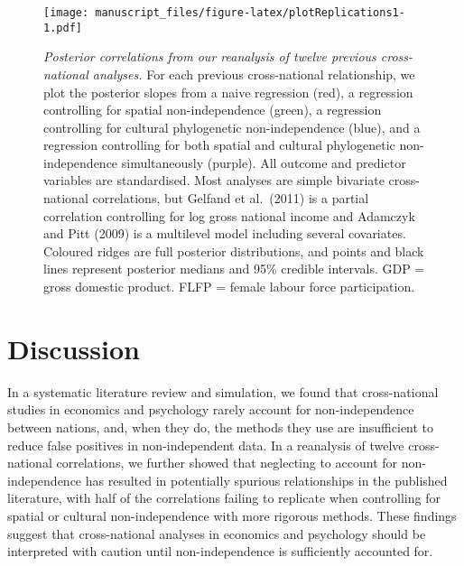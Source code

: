 \documentclass[
  man,floatsintext]{apa6}
\begin{document}
\begin{figure}
\centering
\texttt{[image: manuscript\_files/figure-latex/plotReplications1-1.pdf]}
\caption{\label{fig:plotReplications1}\emph{Posterior correlations from our reanalysis of twelve previous cross-national analyses.} For each previous cross-national relationship, we plot the posterior slopes from a naive regression (red), a regression controlling for spatial non-independence (green), a regression controlling for cultural phylogenetic non-independence (blue), and a regression controlling for both spatial and cultural phylogenetic non-independence simultaneously (purple). All outcome and predictor variables are standardised. Most analyses are simple bivariate cross-national correlations, but Gelfand et al.~(2011) is a partial correlation controlling for log gross national income and Adamczyk and Pitt (2009) is a multilevel model including several covariates. Coloured ridges are full posterior distributions, and points and black lines represent posterior medians and 95\% credible intervals. GDP = gross domestic product. FLFP = female labour force participation.}
\end{figure}

\hypertarget{discussion}{%
\section{Discussion}\label{discussion}}

In a systematic literature review and simulation, we found that cross-national studies in economics and psychology rarely account for non-independence between nations, and, when they do, the methods they use are insufficient to reduce false positives in non-independent data. In a reanalysis of twelve cross-national correlations, we further showed that neglecting to account for non-independence has resulted in potentially spurious relationships in the published literature, with half of the correlations failing to replicate when controlling for spatial or cultural non-independence with more rigorous methods. These findings suggest that cross-national analyses in economics and psychology should be interpreted with caution until non-independence is sufficiently accounted for.
\end{document}
